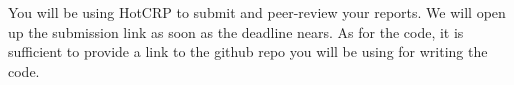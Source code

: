 \documentclass[11pt]{article}
\newcommand{\1}{ \mathbb{1} }
\begin{document}
You will be using HotCRP to submit and peer-review your reports. We will open up the submission link as soon as the deadline nears.  As for the code, it is sufficient to provide a link to the github repo you will be using for writing the code. 




\clearpage
%
%
%
%
%
%
\end{document}
